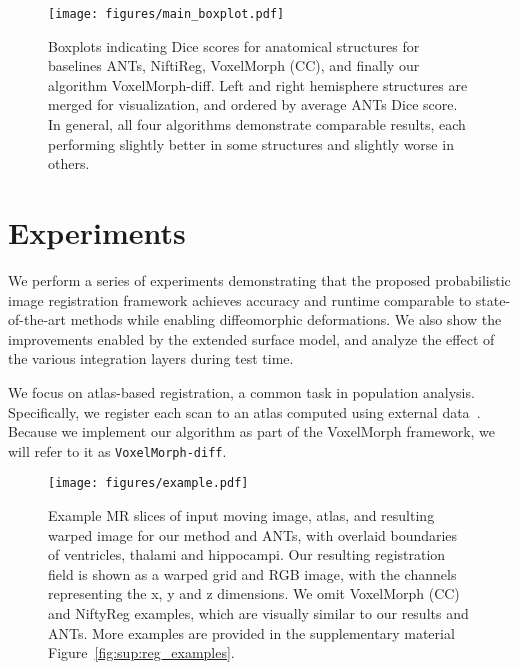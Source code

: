 \documentclass{article}
\newcommand{\citep}{\cite}
\begin{document}
 

\begin{figure*}[tb!]
	\begin{center}
		\texttt{[image: figures/main\_boxplot.pdf]}
	\end{center}
	\caption{Boxplots indicating Dice scores for anatomical structures for baselines ANTs, NiftiReg, VoxelMorph (CC), and finally our algorithm VoxelMorph-diff. Left and right hemisphere structures are merged for visualization, and ordered by average ANTs Dice score. In general, all four algorithms demonstrate comparable results, each performing slightly better in some structures and slightly worse in others. }
	\label{fig:boxplot}
\end{figure*}






\section{Experiments}
\label{sec:results}






We perform a series of experiments demonstrating that the proposed probabilistic image registration framework achieves accuracy and runtime comparable to state-of-the-art methods while enabling diffeomorphic deformations. We also show the improvements enabled by the extended surface model, and analyze the effect of the various integration layers during test time. 

We focus on atlas-based registration, a common task in population analysis. Specifically, we register each scan to an atlas computed using external data~\citep{fischl2012,sridharan2013}. Because we implement our algorithm as part of the VoxelMorph framework, we will refer to it as \verb|VoxelMorph-diff|.


\begin{figure}[t!]
	\begin{center}
		\texttt{[image: figures/example.pdf]}
	\end{center}
\caption{Example MR slices of input moving image, atlas, and resulting warped image for our method and ANTs, with overlaid boundaries of ventricles, thalami and hippocampi. Our resulting registration field is shown as a warped grid and RGB image, {\color{blue}with the channels representing the x, y and z dimensions}. We omit VoxelMorph (CC) and NiftyReg examples, which are visually similar to our results and ANTs. More examples are provided in the supplementary material Figure~\ref{fig:sup:reg_examples}.
	}
\label{fig:reg_examples}
\end{figure}
\end{document}
